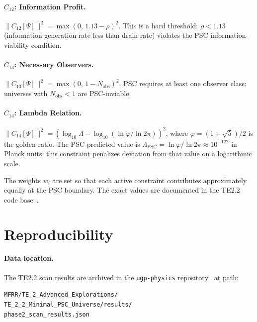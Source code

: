 \documentclass[11pt,twocolumn]{article}
\theoremstyle{remark}
\begin{document}
\paragraph{$C_{12}$: Information Profit.}
$\|C_{12}[\Psi]\|^2 = \max(0,\, 1.13 - \rho)^2$.
This is a hard threshold: $\rho<1.13$ (information generation rate
less than drain rate) violates the PSC information-viability
condition.

\paragraph{$C_{13}$: Necessary Observers.}
$\|C_{13}[\Psi]\|^2 = \max(0,\, 1 - N_{\mathrm{obs}})^2$.
PSC requires at least one observer class; universes with
$N_{\mathrm{obs}}<1$ are PSC-inviable.

\paragraph{$C_{14}$: Lambda Relation.}
$\|C_{14}[\Psi]\|^2 = (\log_{10}\Lambda -
\log_{10}(\ln\varphi/\ln 2\pi))^2$,
where $\varphi=(1+\sqrt{5})/2$ is the golden ratio.
The PSC-predicted value is $\Lambda_{\mathrm{PSC}}=\ln\varphi/\ln
2\pi\approx 10^{-122}$ in Planck units; this constraint penalizes
deviation from that value on a logarithmic scale.

\medskip
The weights $w_i$ are set so that each active constraint contributes
approximately equally at the PSC boundary.
The exact values are documented in the TE2.2 code
base~\cite{SpivackPSCConcordance,ugp-physics-repo}.

\section{Reproducibility}
\label{app:reproducibility}

\paragraph{Data location.}
The TE2.2 scan results are archived in the \texttt{ugp-physics}
repository~\cite{ugp-physics-repo} at path:
\begin{center}
\texttt{MFRR/TE\_2\_Advanced\_Explorations/}\\
\texttt{TE\_2\_2\_Minimal\_PSC\_Universe/results/}\\
\texttt{phase2\_scan\_results.json}
\end{center}
\end{document}
